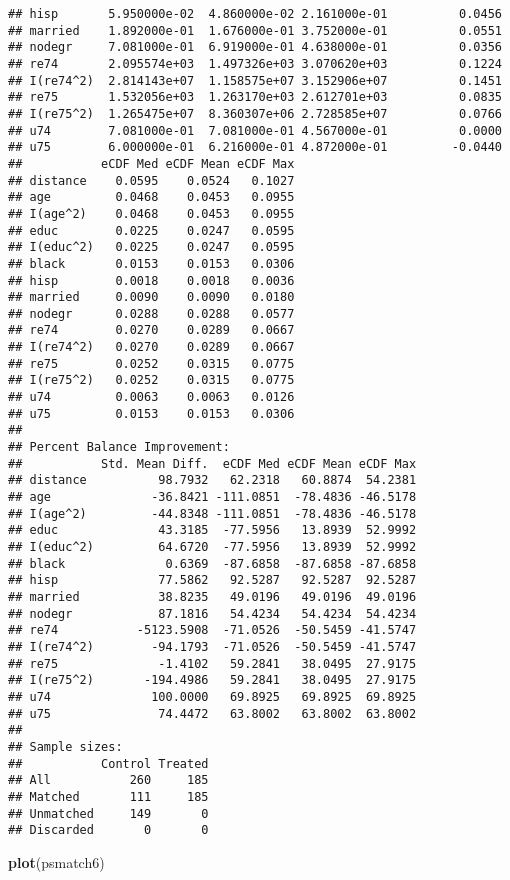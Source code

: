 \documentclass[]{article}
\newenvironment{Shaded}{\begin{snugshade}}{\end{snugshade}}
\newcommand{\KeywordTok}[1]{\textcolor[rgb]{0.13,0.29,0.53}{\textbf{#1}}}
\newcommand{\NormalTok}[1]{#1}
\begin{document}
\begin{verbatim}
## hisp       5.950000e-02  4.860000e-02 2.161000e-01          0.0456
## married    1.892000e-01  1.676000e-01 3.752000e-01          0.0551
## nodegr     7.081000e-01  6.919000e-01 4.638000e-01          0.0356
## re74       2.095574e+03  1.497326e+03 3.070620e+03          0.1224
## I(re74^2)  2.814143e+07  1.158575e+07 3.152906e+07          0.1451
## re75       1.532056e+03  1.263170e+03 2.612701e+03          0.0835
## I(re75^2)  1.265475e+07  8.360307e+06 2.728585e+07          0.0766
## u74        7.081000e-01  7.081000e-01 4.567000e-01          0.0000
## u75        6.000000e-01  6.216000e-01 4.872000e-01         -0.0440
##           eCDF Med eCDF Mean eCDF Max
## distance    0.0595    0.0524   0.1027
## age         0.0468    0.0453   0.0955
## I(age^2)    0.0468    0.0453   0.0955
## educ        0.0225    0.0247   0.0595
## I(educ^2)   0.0225    0.0247   0.0595
## black       0.0153    0.0153   0.0306
## hisp        0.0018    0.0018   0.0036
## married     0.0090    0.0090   0.0180
## nodegr      0.0288    0.0288   0.0577
## re74        0.0270    0.0289   0.0667
## I(re74^2)   0.0270    0.0289   0.0667
## re75        0.0252    0.0315   0.0775
## I(re75^2)   0.0252    0.0315   0.0775
## u74         0.0063    0.0063   0.0126
## u75         0.0153    0.0153   0.0306
## 
## Percent Balance Improvement:
##           Std. Mean Diff.  eCDF Med eCDF Mean eCDF Max
## distance          98.7932   62.2318   60.8874  54.2381
## age              -36.8421 -111.0851  -78.4836 -46.5178
## I(age^2)         -44.8348 -111.0851  -78.4836 -46.5178
## educ              43.3185  -77.5956   13.8939  52.9992
## I(educ^2)         64.6720  -77.5956   13.8939  52.9992
## black              0.6369  -87.6858  -87.6858 -87.6858
## hisp              77.5862   92.5287   92.5287  92.5287
## married           38.8235   49.0196   49.0196  49.0196
## nodegr            87.1816   54.4234   54.4234  54.4234
## re74           -5123.5908  -71.0526  -50.5459 -41.5747
## I(re74^2)        -94.1793  -71.0526  -50.5459 -41.5747
## re75              -1.4102   59.2841   38.0495  27.9175
## I(re75^2)       -194.4986   59.2841   38.0495  27.9175
## u74              100.0000   69.8925   69.8925  69.8925
## u75               74.4472   63.8002   63.8002  63.8002
## 
## Sample sizes:
##           Control Treated
## All           260     185
## Matched       111     185
## Unmatched     149       0
## Discarded       0       0
\end{verbatim}

\begin{Shaded}
\begin{Highlighting}[]
\KeywordTok{plot}\NormalTok{(psmatch6)}
\end{Highlighting}
\end{Shaded}
\end{document}
